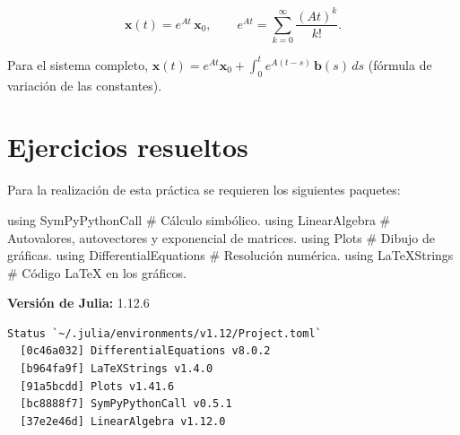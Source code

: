 \documentclass[
  spanish,
  a4paper,
]{scrreport}
\newenvironment{Shaded}{\begin{snugshade}}{\end{snugshade}}
\newcommand{\BuiltInTok}[1]{\textcolor[rgb]{0.00,0.23,0.31}{#1}}
\newcommand{\CommentTok}[1]{\textcolor[rgb]{0.37,0.37,0.37}{#1}}
\newcommand{\ImportTok}[1]{\textcolor[rgb]{0.00,0.46,0.62}{#1}}
\theoremstyle{definition}
\theoremstyle{remark}
\begin{document}
\[
\mathbf{x}(t) = e^{At}\,\mathbf{x}_0, \qquad
e^{At} = \sum_{k=0}^{\infty} \frac{(At)^k}{k!}.
\]

Para el sistema completo,
\(\mathbf{x}(t) = e^{At}\mathbf{x}_0 + \int_0^t e^{A(t-s)}\,\mathbf{b}(s)\,ds\)
(fórmula de variación de las constantes).

\section{Ejercicios resueltos}\label{ejercicios-resueltos-2}

Para la realización de esta práctica se requieren los siguientes
paquetes:

\begin{Shaded}
\begin{Highlighting}[]
\ImportTok{using} \BuiltInTok{SymPyPythonCall}        \CommentTok{\# Cálculo simbólico.}
\ImportTok{using} \BuiltInTok{LinearAlgebra}          \CommentTok{\# Autovalores, autovectores y exponencial de matrices.}
\ImportTok{using} \BuiltInTok{Plots}                  \CommentTok{\# Dibujo de gráficas.}
\ImportTok{using} \BuiltInTok{DifferentialEquations}  \CommentTok{\# Resolución numérica.}
\ImportTok{using} \BuiltInTok{LaTeXStrings}           \CommentTok{\# Código LaTeX en los gráficos.}
\end{Highlighting}
\end{Shaded}

\begin{tcolorbox}[enhanced jigsaw, arc=.35mm, bottomrule=.15mm, bottomtitle=1mm, breakable, colback=white, colbacktitle=quarto-callout-note-color!10!white, colframe=quarto-callout-note-color-frame, coltitle=black, left=2mm, leftrule=.75mm, opacityback=0, opacitybacktitle=0.6, rightrule=.15mm, title=\textcolor{quarto-callout-note-color}{\faInfo}\hspace{0.5em}{Versiones de Julia y de los paquetes utilizados}, titlerule=0mm, toprule=.15mm, toptitle=1mm]

\textbf{Versión de Julia:} 1.12.6

\begin{verbatim}
Status `~/.julia/environments/v1.12/Project.toml`
  [0c46a032] DifferentialEquations v8.0.2
  [b964fa9f] LaTeXStrings v1.4.0
  [91a5bcdd] Plots v1.41.6
  [bc8888f7] SymPyPythonCall v0.5.1
  [37e2e46d] LinearAlgebra v1.12.0
\end{verbatim}

\end{tcolorbox}
\end{document}
